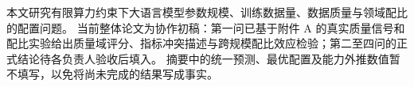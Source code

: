 本文研究有限算力约束下大语言模型参数规模、训练数据量、数据质量与领域配比的配置问题。
当前整体论文为协作初稿：第一问已基于附件 A 的真实质量信号和配比实验给出质量域评分、指标冲突描述与跨规模配比效应检验；第二至四问的正式结论待各负责人验收后填入。
摘要中的统一预测、最优配置及能力外推数值暂不填写，以免将尚未完成的结果写成事实。
